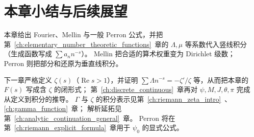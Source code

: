 \begin{center}
\end{center}

\section*{本章小结与后续展望}

本章给出 Fourier、Mellin 与一般 Perron 公式，并把第~\ref{ch:elementary_number_theoretic_functions}~章的
$\Lambda,\mu$ 等系数代入竖线积分（生成函数写成 $\sum a_n n^{-s}$）。
Mellin 把合适的算术权重变为 Dirichlet 级数；Perron 则把部分和还原为垂直线积分。

下一章严格定义 $\zeta(s)$（$\operatorname{Re}s>1$），并证明
$\sum\Lambda n^{-s}=-\zeta'/\zeta$ 等，从而把本章的 $F(s)$ 写成含 $\zeta$ 的闭形式；
第~\ref{ch:discrete_continuous}~章再对 $\psi,M,J,\theta,\pi$ 完成从定义到积分的推导。
$\Gamma$ 与 $\zeta$ 的积分表示见第~\ref{ch:riemann_zeta_intro}~、\ref{ch:gamma_function}~章；
解析延拓见第~\ref{ch:analytic_continuation_general}~章。
Perron 将在第~\ref{ch:riemann_explicit_formula}~章用于 $\psi_0$ 的显式公式。
